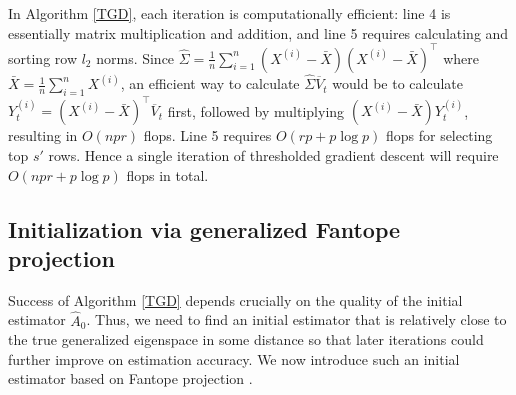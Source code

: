 \documentclass[11pt]{article}
\newcommand{\nb}[1]{\textcolor{orange}{\texttt{[#1]}}}
\newcommand{\gsc}[1]{\textcolor{blue}{\texttt{[#1]}}}
\newcommand{\bA}{\widehat{A}}
\newcommand{\gd}{\overline{V}}
\newcommand{\0}{{\mathbf{0}}}
\newcommand{\bx}{{\bar{X}}}
\begin{document}
In Algorithm \ref{TGD}, each iteration is computationally efficient: line 4 is essentially matrix multiplication and addition, and line 5 requires calculating and sorting row $l_2$ norms. %
Since $\widehat{\Sigma} = \frac{1}{n}\sum_{i=1}^n(X^{(i)}-\bx)(X^{(i)}-\bx)^\top$ where $\bx = \frac{1}{n}\sum_{i=1}^n X^{(i)}$, an efficient way to calculate $\widehat{\Sigma}\gd_t$ would be to calculate 
$Y_t^{(i)} = (X^{(i)}-\bx)^\top \gd_t$ first, followed by multiplying $ (X^{(i)}-\bx) Y_t^{(i)}$,
resulting in $O(npr)$ flops. %
Line 5 requires $O(rp+p\log p)$ flops for selecting top $s'$ rows. 
Hence a single iteration of thresholded gradient descent will require 
$O(npr + p\log p)$ flops in total. 

\subsection{Initialization via generalized Fantope projection}
\label{sec:init}



Success of Algorithm \ref{TGD} depends crucially on the quality of the initial estimator $\bA_0$.
Thus, we need to find an initial estimator that is relatively close to the true generalized eigenspace in some distance so that later iterations could further improve on estimation accuracy. 
We now introduce such an initial estimator based on Fantope projection \citep{vu2013fantope}. 
\end{document}
